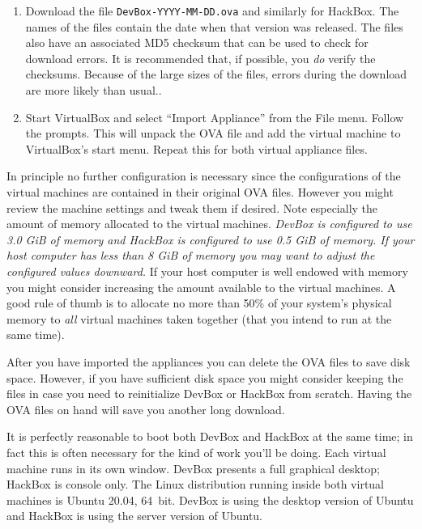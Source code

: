 \documentclass[twocolumn]{article}
\begin{document}
\begin{enumerate}

\item Download the file \texttt{DevBox-YYYY-MM-DD.ova} and similarly for HackBox. The names of
  the files contain the date when that version was released. The files also have an associated
  MD5 checksum that can be used to check for download errors. It is recommended that, if
  possible, you \emph{do} verify the checksums. Because of the large sizes of the files, errors
  during the download are more likely than usual..

\item Start VirtualBox and select ``Import Appliance'' from the File menu. Follow the prompts.
  This will unpack the OVA file and add the virtual machine to VirtualBox's start menu. Repeat
  this for both virtual appliance files.

\end{enumerate}

In principle no further configuration is necessary since the configurations of the virtual
machines are contained in their original OVA files. However you might review the machine
settings and tweak them if desired. Note especially the amount of memory allocated to the
virtual machines. \emph{DevBox is configured to use 3.0 GiB of memory and HackBox is configured
  to use 0.5 GiB of memory. If your host computer has less than 8 GiB of memory you may want to
  adjust the configured values downward.} If your host computer is well endowed with memory you
might consider increasing the amount available to the virtual machines. A good rule of thumb is
to allocate no more than 50\% of your system's physical memory to \emph{all} virtual machines
taken together (that you intend to run at the same time).

After you have imported the appliances you can delete the OVA files to save disk space. However,
if you have sufficient disk space you might consider keeping the files in case you need to
reinitialize DevBox or HackBox from scratch. Having the OVA files on hand will save you another
long download.

It is perfectly reasonable to boot both DevBox and HackBox at the same time; in fact this is
often necessary for the kind of work you'll be doing. Each virtual machine runs in its own
window. DevBox presents a full graphical desktop; HackBox is console only. The Linux
distribution running inside both virtual machines is Ubuntu 20.04, 64~bit. DevBox is using the
desktop version of Ubuntu and HackBox is using the server version of Ubuntu.
\end{document}
